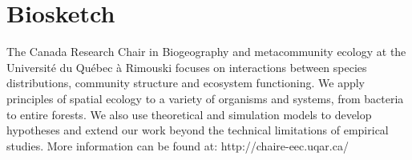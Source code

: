 \documentclass[11pt]{article}
\begin{document}
\nolinenumbers

%
%

\renewcommand\refname{Literature Cited}
{}



%
%

\section*{Biosketch}
The Canada Research Chair in Biogeography and metacommunity ecology at the Université du Québec à Rimouski focuses on interactions between species distributions, community structure and ecosystem functioning.
We apply principles of spatial ecology to a variety of organisms and systems, from bacteria to entire forests.
We also use theoretical and simulation models to develop hypotheses and extend our work beyond the technical limitations of empirical studies.
More information can be found at: http://chaire-eec.uqar.ca/
\end{document}

